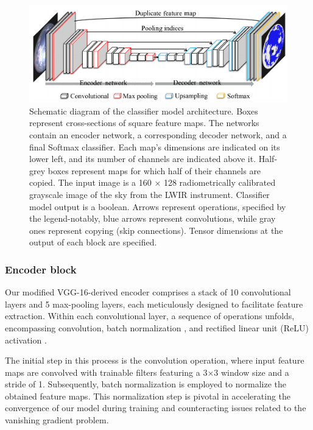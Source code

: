 \documentclass[amt, article]{copernicus}
\begin{document}
\begin{figure}[t]
	\includegraphics[width=\hsize]{figures/schematics_segmentation_model.png}
	\caption{
		Schematic diagram of the classifier model architecture. Boxes represent cross-sections of square feature maps.  The networks contain an encoder network, a corresponding decoder network, and a final Softmax classifier. Each map's dimensions are indicated on its lower left, and its number of channels are indicated above it. Half-grey boxes represent maps for which half of their channels are copied. The input image is a 160 × 128 radiometrically calibrated grayscale image of the sky from the LWIR instrument. Classifier model output is a boolean. Arrows represent operations, specified by the legend-notably, blue arrows represent convolutions, while gray ones represent copying (skip connections). Tensor dimensions at the output of each block are specified.}
        \label{fig:schematics_classification_model}
\end{figure}

\subsubsection{Encoder block}

Our modified VGG-16-derived encoder comprises a stack of 10 convolutional layers and 5 max-pooling layers, each meticulously designed to facilitate feature extraction. Within each convolutional layer, a sequence of operations unfolds, encompassing convolution, batch normalization \citep{ioffe2015batch, bjorck2018understanding}, and rectified linear unit (ReLU) activation \citep{agarap2018deep}.

The initial step in this process is the convolution operation, where input feature maps are convolved with trainable filters featuring a 3$\times$3 window size and a stride of 1. Subsequently, batch normalization is employed to normalize the obtained feature maps. This normalization step is pivotal in accelerating the convergence of our model during training and counteracting issues related to the vanishing gradient problem.
\end{document}
